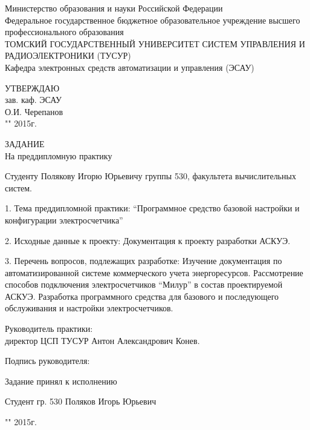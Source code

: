 \newpage
{}

\begin{center}
 Министерство образования и науки Российской Федерации\\
 Федеральное государственное бюджетное образовательное учреждение высшего профессионального образования\\
 ТОМСКИЙ ГОСУДАРСТВЕННЫЙ УНИВЕРСИТЕТ СИСТЕМ УПРАВЛЕНИЯ И РАДИОЭЛЕКТРОНИКИ (ТУСУР)\\
 Кафедра электронных средств автоматизации и управления (ЭСАУ)\\
\end{center}

\begin{flushright}
 \begin{minipage}{0.4\textwidth}
  УТВЕРЖДАЮ \\
  зав. каф. ЭСАУ \\
  \underline{\hspace{2.5cm}}О.И. Черепанов \\
  "\underline{\hspace{1cm}}"\underline{\hspace{3cm}} 2015г.
 \end{minipage}
\end{flushright}

\vspace{2cm}

\begin{center}
 ЗАДАНИЕ \\
 На преддипломную практику
\end{center}

Студенту Полякову Игорю Юрьевичу группы 530, факультета вычислительных систем.

1. Тема преддипломной практики: ``Программное средство базовой настройки и конфигурации электросчетчика''

2. Исходные данные к проекту: Документация к проекту разработки АСКУЭ.

3. Перечень вопросов, подлежащих разработке: Изучение документация по автоматизированной системе коммерческого учета энергоресурсов. Рассмотрение способов подключения электросчетчиков ``Милур'' в состав проектируемой АСКУЭ. Разработка программного средства для базового и последующего обслуживания и настройки электросчетчиков.
 
Руководитель практики: \\ директор ЦСП ТУСУР Антон Александрович Конев.

\hfill Подпись руководителя: \underline{\hspace{2.5cm}}

Задание принял к исполнению

Студент гр. 530 Поляков Игорь Юрьевич \hfill \underline{\hspace{2.5cm}}

\hfill "\underline{\hspace{1cm}}"\underline{\hspace{3cm}} 2015г.